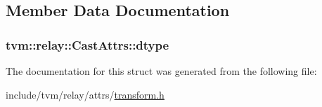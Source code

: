 \subsection{Member Data Documentation}
\subsubsection[{\texorpdfstring{dtype}{dtype}}]{ tvm\+::relay\+::\+Cast\+Attrs\+::dtype}\hypertarget{structtvm_1_1relay_1_1CastAttrs_a0ba181c2c6c542448a841f3a87e360c7}{}\label{structtvm_1_1relay_1_1CastAttrs_a0ba181c2c6c542448a841f3a87e360c7}


The documentation for this struct was generated from the following file\+:\begin{DoxyCompactItemize}
\item 
include/tvm/relay/attrs/\hyperlink{include_2tvm_2relay_2attrs_2transform_8h}{transform.\+h}\end{DoxyCompactItemize}
